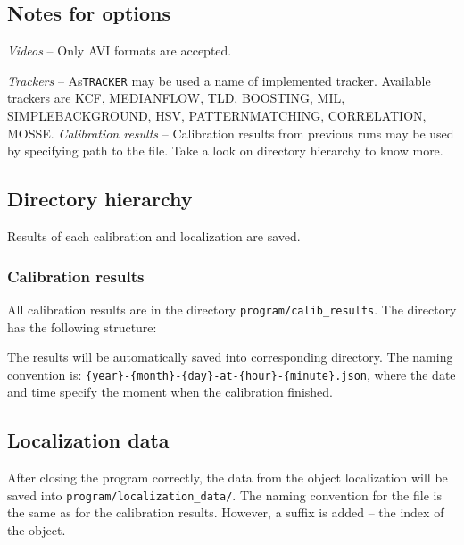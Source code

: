 \begin{figure}
\lstset{basicstyle=\ttfamily\footnotesize,breaklines=true,frame=lrtb}

\end{figure}

\subsection{Notes for options}
\emph{Videos} -- Only AVI formats are accepted.

\emph{Trackers} -- As\verb+TRACKER+ may be used a name of implemented tracker. Available trackers
are KCF, MEDIANFLOW, TLD, BOOSTING, MIL, SIMPLEBACKGROUND, HSV,
PATTERNMATCHING, CORRELATION, MOSSE.
\emph{Calibration results} -- Calibration results from previous runs may be
used by specifying path to the file. Take a look on directory hierarchy to know
more.

\subsection{Directory hierarchy}
Results of each calibration and localization are saved.

\subsubsection{Calibration results}
All calibration results are in the directory \verb+program/calib_results+. The
directory has the following structure:

\begin{figure}
 \end{figure}

The results will be automatically saved into corresponding directory. The
naming convention is: \verb+{year}-{month}-{day}-at-{hour}-{minute}.json+,
where the date and time specify the moment when the calibration finished.

\subsection{Localization data}
After closing the program correctly, the data from the object localization will
be saved into \verb+program/localization_data/+. The naming convention for the
file is the same as for the calibration results. However, a suffix is added --
the index of the object.

